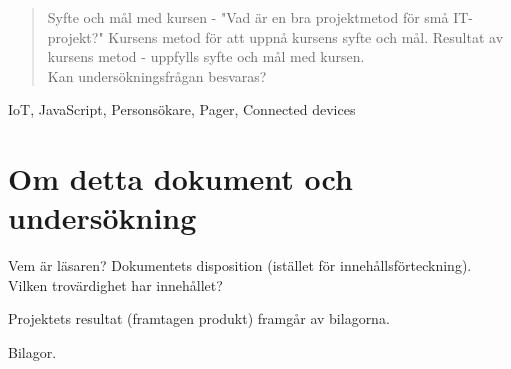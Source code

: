 
\begin{abstract}
Syfte och mål med kursen - "Vad är en bra projektmetod för små IT-projekt?" Kursens metod för att uppnå
kursens syfte och mål. Resultat av kursens metod - uppfylls syfte och mål med kursen.\\
Kan undersökningsfrågan besvaras?
\end{abstract}

\begin{IEEEkeywords}
IoT, JavaScript, Personsökare, Pager, Connected devices
\end{IEEEkeywords}

\section{Om detta dokument och undersökning}
Vem är läsaren? Dokumentets disposition (istället för innehållsförteckning). Vilken trovärdighet har innehållet?

Projektets resultat (framtagen produkt) framgår av bilagorna.

Bilagor.